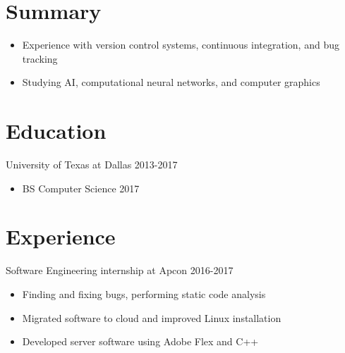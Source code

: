 \documentclass[line,margin]{res}
\begin{document}
	\address{10108 Tularosa Pass, Austin, TX 78726}
	\address{(512)574-6609 |
	\href{mailto:blakerandall0@gmail.com}{blakerandall0@gmail.com}}

\begin{resume}

\vspace{8pt}
\section{Summary}
\vspace{22pt}
	\begin{itemize} \itemsep -2pt
	\item Experience with version control systems, continuous integration, and bug tracking
	\item Studying AI, computational neural networks, and computer graphics
	\end{itemize}

\vspace{-4pt}
\section{Education}
\vspace{12pt}
University of Texas at Dallas \hfill 2013-2017 \\
\vspace{-12pt}
	\begin{itemize} \itemsep -2pt
	\item BS Computer Science 2017
	\end{itemize}

\vspace{-4pt}
\section{Experience}
\vspace{12pt}
Software Engineering internship at Apcon
\hfill 2016-2017
	\begin{itemize} \itemsep -2pt
	\item Finding and fixing bugs, performing static code analysis
	\item Migrated software to cloud and improved Linux installation
	\item Developed server software using Adobe Flex and C++
	\end{itemize}

\vspace{-4pt}

\end{resume}
\end{document}
